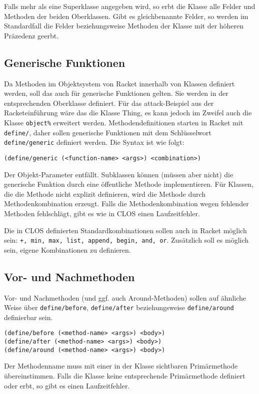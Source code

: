 Falls mehr als eine Superklasse angegeben wird, so erbt die Klasse alle Felder und Methoden der beiden Oberklassen. Gibt es gleichbenannte Felder, so werden im Standardfall die Felder beziehungsweise Methoden der Klasse mit der höheren Präzedenz geerbt.

\subsection{Generische Funktionen}
Da Methoden im Objektsystem von Racket innerhalb von Klassen definiert werden, soll das auch für generische Funktionen gelten. Sie werden in der entsprechenden Oberklasse definiert. Für das attack-Beispiel aus der Racketeinführung wäre das die Klasse Thing, es kann jedoch im Zweifel auch die Klasse \texttt{object\%} erweitert werden. Methodendefinitionen starten in Racket mit \texttt{define/}, daher sollen generische Funktionen mit dem Schlüsselwort \texttt{define/generic} definiert werden. Die Syntax ist wie folgt:

\texttt{(define/generic ({\textless}function-name{\textgreater} {\textless}args{\textgreater}) {\textless}combination{\textgreater})}

Der Objekt-Parameter entfällt. Subklassen können (müssen aber nicht) die generische Funktion durch eine öffentliche Methode implementieren. Für Klassen, die die Methode nicht explizit definieren, wird die Methode durch Methodenkombination erzeugt. Falls die Methodenkombination wegen fehlender Methoden fehlschlägt, gibt es wie in CLOS einen Laufzeitfehler.

Die in CLOS definierten Standardkombinationen sollen auch in Racket möglich sein: \texttt{+, min, max, list, append, begin, and, or}. 
Zusätzlich soll es möglich sein, eigene Kombinationen zu definieren.


\subsection{Vor- und Nachmethoden}
Vor- und Nachmethoden (und ggf. auch Around-Methoden) sollen auf ähnliche Weise über \texttt{define/before}, \texttt{define/after} beziehungsweise \texttt{define/around} definierbar sein. 

\texttt{(define/before ({\textless}method-name{\textgreater} {\textless}args{\textgreater}) {\textless}body{\textgreater})}\\
\texttt{(define/after ({\textless}method-name{\textgreater} {\textless}args{\textgreater}) {\textless}body{\textgreater})}\\
\texttt{(define/around ({\textless}method-name{\textgreater} {\textless}args{\textgreater}) {\textless}body{\textgreater})}

Der Methodenname muss mit einer in der Klasse sichtbaren Primärmethode übereinstimmen. Falls die Klasse keine entsprechende Primärmethode definiert oder erbt, so gibt es einen Laufzeitfehler.